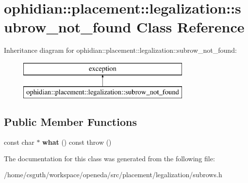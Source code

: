 \hypertarget{classophidian_1_1placement_1_1legalization_1_1subrow__not__found}{\section{ophidian\-:\-:placement\-:\-:legalization\-:\-:subrow\-\_\-not\-\_\-found Class Reference}
\label{classophidian_1_1placement_1_1legalization_1_1subrow__not__found}
}
Inheritance diagram for ophidian\-:\-:placement\-:\-:legalization\-:\-:subrow\-\_\-not\-\_\-found\-:\begin{figure}[H]
\begin{center}
\leavevmode
\includegraphics[height=2.000000cm]{classophidian_1_1placement_1_1legalization_1_1subrow__not__found}
\end{center}
\end{figure}
\subsection*{Public Member Functions}
\begin{DoxyCompactItemize}
\item 
\hypertarget{classophidian_1_1placement_1_1legalization_1_1subrow__not__found_a1a5973fe1f71865ec2ddaecc930c60d1}{const char $\ast$ {\bfseries what} () const   throw ()}\label{classophidian_1_1placement_1_1legalization_1_1subrow__not__found_a1a5973fe1f71865ec2ddaecc930c60d1}

\end{DoxyCompactItemize}


The documentation for this class was generated from the following file\-:\begin{DoxyCompactItemize}
\item 
/home/csguth/workspace/openeda/src/placement/legalization/subrows.\-h\end{DoxyCompactItemize}

